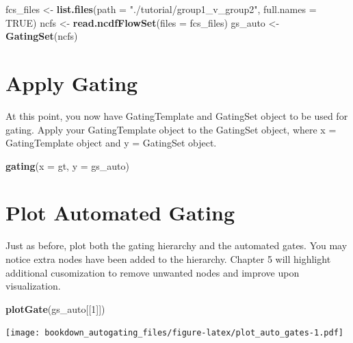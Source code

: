 \documentclass[]{book}
\newenvironment{Shaded}{\begin{snugshade}}{\end{snugshade}}
\newcommand{\DataTypeTok}[1]{\textcolor[rgb]{0.13,0.29,0.53}{#1}}
\newcommand{\DecValTok}[1]{\textcolor[rgb]{0.00,0.00,0.81}{#1}}
\newcommand{\KeywordTok}[1]{\textcolor[rgb]{0.13,0.29,0.53}{\textbf{#1}}}
\newcommand{\NormalTok}[1]{#1}
\newcommand{\OtherTok}[1]{\textcolor[rgb]{0.56,0.35,0.01}{#1}}
\newcommand{\StringTok}[1]{\textcolor[rgb]{0.31,0.60,0.02}{#1}}
\begin{document}
\begin{Shaded}
\begin{Highlighting}[]
\NormalTok{fcs_files <-}\StringTok{ }\KeywordTok{list.files}\NormalTok{(}\DataTypeTok{path =} \StringTok{"./tutorial/group1_v_group2"}\NormalTok{, }\DataTypeTok{full.names =} \OtherTok{TRUE}\NormalTok{)}
\NormalTok{ncfs  <-}\StringTok{ }\KeywordTok{read.ncdfFlowSet}\NormalTok{(}\DataTypeTok{files =}\NormalTok{ fcs_files)}
\NormalTok{gs_auto <-}\StringTok{ }\KeywordTok{GatingSet}\NormalTok{(ncfs)}
\end{Highlighting}
\end{Shaded}

\hypertarget{apply-gating}{%
\section{Apply Gating}\label{apply-gating}}

At this point, you now have GatingTemplate and GatingSet object to be used for gating. Apply your GatingTemplate object to the GatingSet object, where x = GatingTemplate object and y = GatingSet object.

\begin{Shaded}
\begin{Highlighting}[]
\KeywordTok{gating}\NormalTok{(}\DataTypeTok{x =}\NormalTok{ gt, }\DataTypeTok{y =}\NormalTok{ gs_auto)}
\end{Highlighting}
\end{Shaded}

\hypertarget{plot-automated-gating}{%
\section{Plot Automated Gating}\label{plot-automated-gating}}

Just as before, plot both the gating hierarchy and the automated gates. You may notice extra nodes have been added to the hierarchy. Chapter 5 will highlight additional cusomization to remove unwanted nodes and improve upon visualization.

\begin{Shaded}
\begin{Highlighting}[]
\KeywordTok{plotGate}\NormalTok{(gs_auto[[}\DecValTok{1}\NormalTok{]])}
\end{Highlighting}
\end{Shaded}

\texttt{[image: bookdown\_autogating\_files/figure-latex/plot\_auto\_gates-1.pdf]}
\end{document}

